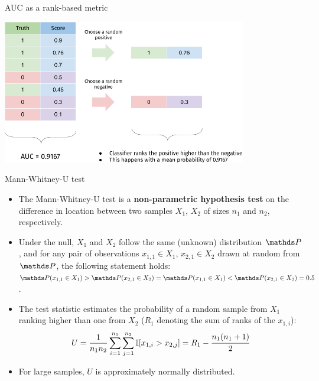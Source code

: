 \documentclass[11pt,compress,t,notes=noshow, xcolor=table]{beamer}
\begin{document}
\begin{vbframe}{AUC as a rank-based metric}
\begin{center}
  \includegraphics[width=0.8\textwidth]{figure_man/auc_interpretation_new}
\end{center}

\end{vbframe}


\begin{vbframe}{Mann-Whitney-U test}

\begin{itemize}
  \item The Mann-Whitney-U test is a \textbf{non-parametric hypothesis test} on 
  the difference in location between two samples $X_1$, $X_2$ of sizes $n_1$ and 
  $n_2$, respectively.
  \item Under the null, $X_1$ and $X_2$ follow the same (unknown) distribution 
  $\P$, and for any pair of observations $x_{1,1} \in X_1$, $x_{2,1} \in X_2$ 
  drawn at random from $\P$, the following statement holds:
  $\P(x_{1,1} \in X_1) > \P(x_{2,1} \in X_2) = \P(x_{1,1} \in X_1) < \P(x_{2,1} 
  \in X_2) = 0.5$.
  \item The test statistic estimates the probability of a random sample from 
  $X_1$ ranking higher than one from $X_2$ ($R_1$ denoting the sum of 
  ranks of the $x_{1,i}$):
  \begin{equation*}
      U = \frac{1}{n_1 n_2} \sum_{i = 1}^{n_1} \sum_{j = 1}^{n_2} 
      \mathbb{I}[x_{1,i} > x_{2,j}]
      = R_1 - \cfrac{n_1(n_1 + 1)}{2}
  \end{equation*}
  \item For large samples, $U$ is approximately normally distributed.
\end{itemize}

\end{vbframe}
\end{document}
